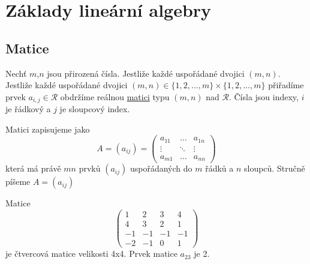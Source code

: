 \chapter{Základy lineární algebry}
\minitoc
\newpage
  \section{Matice}
    \begin{definition}\label{def_matice}
      Nechť $m$,$n$ jsou přirozená čísla. Jestliže každé uspořádané dvojici $(m,n)$. Jestliže každé
      uspořádané dvojici $(m,n)\in \{1,2,\ldots,m\}\times \{1,2,\ldots,m\}$ přiřadíme prvek
      $a_{i,j}\in\mathcal{R}$ obdržíme reálnou \href{http://cs.wikipedia.org/wiki/Matice}{matici} typu 
      $(m,n)$ nad $\mathcal{R}$. Čísla jsou indexy, $i$ je řádkový a $j$ je sloupcový index.
      
      Matici zapisujeme jako
      \begin{equation}\label{matice_zapis}
        A = \left(a_{ij}\right) =\left(
          \begin{array}{ccc}
            a_{11} & \ldots & a_{1n} \\
            \vdots & \ddots & \vdots \\
            a_{m1} & \ldots & a_{nn}
          \end{array}
        \right)
      \end{equation}
      která má právě $ mn $ prvků $ \left(a_{ij}\right) $ uspořádaných do $ m $ řádků a $ n $ sloupců. 
      Stručně píšeme $ A = \left(a_{ij}\right) $
    \end{definition}
  
    \begin{example}
      Matice
      \begin{displaymath}
          \left(\begin{array}{rrrr}1&2&3&4\\4&3&2&1\\-1&-1&-1&-1\\-2&-1&0&1\end{array}\right)
      \end{displaymath}
      je čtvercová matice velikosti 4x4. Prvek matice $ a_{23} $ je 2.
    \end{example}  
    
